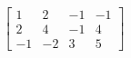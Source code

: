 %
\begin{align*}
\begin{bmatrix}
1 & 2 & -1 & -1 \\
2 & 4 & -1 & 4 \\
-1 & -2 & 3 & 5
\end{bmatrix}
\end{align*}
%
